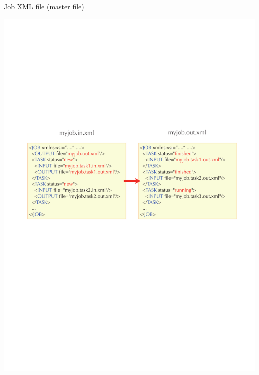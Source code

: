 \begin{frame}[t,fragile]{Job XML file (master file)}
  \begin{center}
    \includegraphics[height=.6\textheight]{simulation2.pdf}
  \end{center}
\end{frame}

